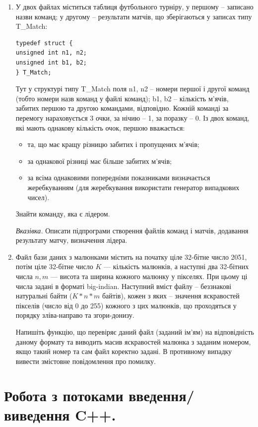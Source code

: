 \documentclass[a5paper,titlepage,openany,twoside,
]
{book_unv}%
\begin{document}
\begin{enumerate}
\def\labelenumi{\arabic{enumi})}
\setcounter{enumi}{12}
\item
  У двох файлах міститься таблиця футбольного турніру, у першому --
  записано назви команд; у другому -- результати матчів, що зберігаються
  у записах типу T\_Match:
\begin{verbatim}
typedef struct {
unsigned int n1, n2;
unsigned int b1, b2;
} T_Match;
\end{verbatim}
Тут у структурі типу T\_Match поля n1, n2 -- номери першої і другої 
команд (тобто номери назв команд у файлі команд); b1, b2 -- кількість
м'ячів, забитих першою та другою командами, відповідно.
Кожній команді за перемогу нараховується 3 очки, за нічию -- 1, за
поразку -- 0.
Із двох команд, які мають однакову кількість очок, першою вважається:
\begin{itemize}
\item
та, що має кращу різницю забитих і пропущених м'ячів;
\item
за однакової різниці має більше забитих м'ячів;
\item
за всіма однаковими попередніми показниками визначається жеребкуванням
(для жеребкування використати генератор випадкових чисел).
\end{itemize}
Знайти команду, яка є лідером.

\emph{Вказівка.} Описати підпрограми створення файлів команд і матчів, 
додавання результату матчу, визначення лідера.

\item
Файл бази даних з малюнками містить на початку ціле 32-бітне число
2051, потім ціле 32-бітне число $K$ --- кількість малюнків, а наступні два
32-бітних числа $n,m$ --- висота та ширина кожного малюнку у
пікселях. При цьому ці числа задані в форматі big-indian.
Наступний вміст файлу -- беззнакові натуральні байти ($K*n*m$ байтів),
кожен з яких -- значення яскравостей пікселів (число від 0 до 255)
кожного з цих малюнків, що проходяться у порядку зліва-направо та
згори-донизу.

Напишіть функцію, що перевіряє даний файл (заданий ім'ям) на
відповідність даному формату та виводить масив яскравостей малюнка з
заданим номером, якщо такий номер та сам файл коректно задані. В
противному випадку вивести змістовне повідомлення про помилку.

\end{enumerate}


\chapter{Робота з потоками введення/виведення C++.}
%
\end{document}
